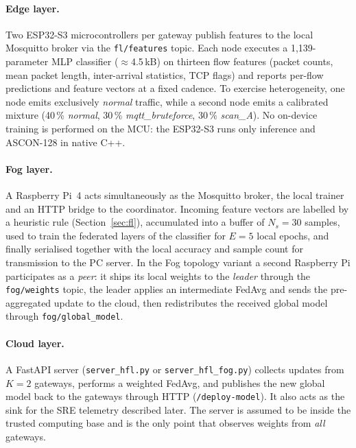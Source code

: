 \documentclass[runningheads]{llncs}
\begin{document}
\paragraph{Edge layer.}
Two ESP32-S3 microcontrollers per gateway publish features to the local
Mosquitto broker via the \texttt{fl/features} topic. Each node executes a
1{,}139-parameter MLP classifier ($\approx$4.5\,kB) on thirteen flow
features (packet counts, mean packet length, inter-arrival statistics, TCP
flags) and reports per-flow predictions and feature vectors at a fixed
cadence. To exercise heterogeneity, one node emits exclusively
\emph{normal} traffic, while a second node emits a calibrated mixture
(40\,\% \emph{normal}, 30\,\% \emph{mqtt\_bruteforce}, 30\,\% \emph{scan\_A}).
No on-device training is performed on the MCU: the ESP32-S3 runs only
inference and ASCON-128 in native C++.

\paragraph{Fog layer.}
A Raspberry Pi~4 acts simultaneously as the Mosquitto broker, the local
trainer and an HTTP bridge to the coordinator. Incoming feature vectors
are labelled by a heuristic rule (Section~\ref{sec:fl}), accumulated into a
buffer of $N_s = 30$ samples, used to train the federated layers of the
classifier for $E = 5$ local epochs, and finally serialised together with
the local accuracy and sample count for transmission to the PC server. In
the Fog topology variant a second Raspberry Pi participates as a
\emph{peer}: it ships its local weights to the \emph{leader} through the
\texttt{fog/weights} topic, the leader applies an intermediate FedAvg and
sends the pre-aggregated update to the cloud, then redistributes the
received global model through \texttt{fog/global\_model}.

\paragraph{Cloud layer.}
A FastAPI server (\texttt{server\_hfl.py} or \texttt{server\_hfl\_fog.py})
collects updates from $K = 2$ gateways, performs a weighted FedAvg, and
publishes the new global model back to the gateways through HTTP
(\texttt{/deploy-model}). It also acts as the sink for the SRE telemetry
described later. The server is assumed to be inside the trusted computing
base and is the only point that observes weights from \emph{all} gateways.
\end{document}
